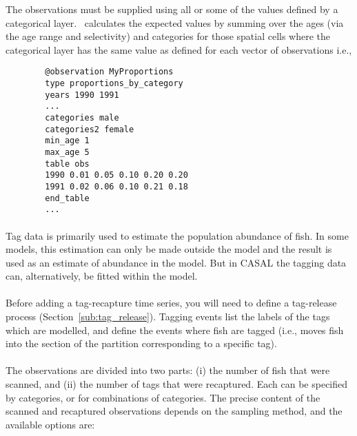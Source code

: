 {{{{The observations must be supplied using all or some of the values defined by a categorical layer. \CNAME\ calculates the expected values by summing over the ages (via the age range and selectivity) and categories for those spatial cells where the categorical layer has the same value as defined for each vector of observations i.e.,

{\small{\begin{verbatim}
		@observation MyProportions
		type proportions_by_category
		years 1990 1991
		...
		categories male
		categories2 female
		min_age 1
		max_age 5
		table obs
		1990 0.01 0.05 0.10 0.20 0.20
		1991 0.02 0.06 0.10 0.21 0.18
		end_table
		...
		\end{verbatim}}}

\paragraph*{\label{sec:tag-recapture-by-length}}

Tag data is primarily used to estimate the population abundance of fish. In some models, this estimation can only be made outside the model and the result is used as an estimate of abundance in the model. But in CASAL the tagging data can, alternatively, be fitted within the model.
\\\\
Before adding a tag-recapture time series, you will need to define a tag-release process (Section~\ref{sub:tag_release}). Tagging events list the labels of the tags which are modelled, and define the events where fish are tagged (i.e., \CNAME moves fish into the section of the partition corresponding to a specific tag).
\\\\
The observations are divided into two parts: (i) the number of fish that were scanned, and (ii) the number of tags that were recaptured. Each can be specified by categories, or for combinations of categories. The precise content of the scanned and recaptured observations depends on the sampling method, and the available options are:

}}}}
